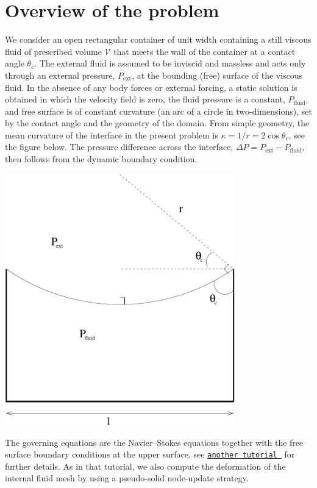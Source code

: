 \hypertarget{index_overview}{}\section{Overview of the problem}\label{index_overview}
We consider an open rectangular container of unit width containing a still viscous fluid of prescribed volume $ \mathcal{V} $ that meets the wall of the container at a contact angle $ \theta_{c} $. The external fluid is assumed to be inviscid and massless and acts only through an external pressure, $ P_{\mbox{ext}} $, at the bounding (free) surface of the viscous fluid. In the absence of any body forces or external forcing, a static solution is obtained in which the velocity field is zero, the fluid pressure is a constant, $ P_{\mbox{fluid}} $, and free surface is of constant curvature (an arc of a circle in two-\/dimensions), set by the contact angle and the geometry of the domain. From simple geometry, the mean curvature of the interface in the present problem is $ \kappa = 1/r = 2\cos\theta_{c} $, see the figure below. The pressure difference across the interface, $ \Delta P = P_{\mbox{ext}} - P_{\mbox{fluid}} $, then follows from the dynamic boundary condition.

 
\begin{DoxyImage}
\includegraphics[width=0.75\textwidth]{sketch}
\end{DoxyImage}


The governing equations are the Navier--Stokes equations together with the free surface boundary conditions at the upper surface, see \href{../../single_layer_free_surface/html/index.html}{\tt another tutorial } for further details. As in that tutorial, we also compute the deformation of the internal fluid mesh by using a pseudo-\/solid node-\/update strategy.


